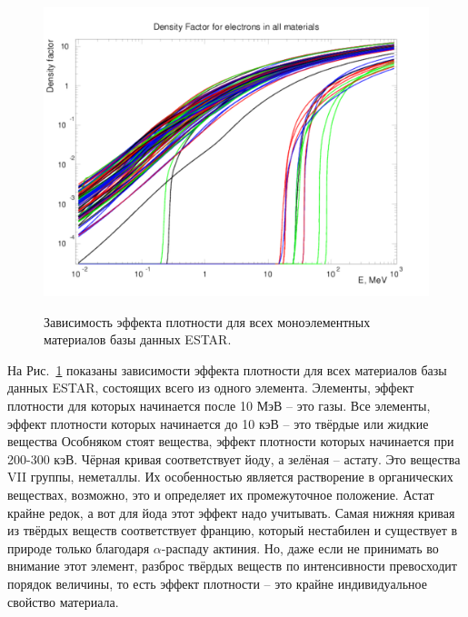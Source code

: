 \documentclass[a4paper,12pt]{article}
\begin{document}
\begin{large}
  \begin{figure}[ht]
    {
       \includegraphics[width=0.99\linewidth]{images/denf_all}
    }
    \caption{Зависимость эффекта плотности для всех моноэлементных материалов базы данных ESTAR.}
    \label{fig:denf_all}
  \end{figure}
  На Рис.~\ref{fig:denf_all} показаны зависимости эффекта плотности для всех материалов базы данных ESTAR, состоящих всего из одного элемента.
  Элементы, эффект плотности для которых начинается после 10 МэВ -- это газы.
  Все элементы, эффект плотности которых начинается до 10 кэВ -- это твёрдые или жидкие вещества
  Особняком стоят вещества, эффект плотности которых начинается при 200-300 кэВ.
  Чёрная кривая соответствует йоду, а зелёная -- астату.
  Это вещества VII группы, неметаллы.
  Их особенностью является растворение в органических веществах, возможно, это и определяет их промежуточное положение.
  Астат крайне редок, а вот для йода этот эффект надо учитывать.
  Самая нижняя кривая из твёрдых веществ соответствует францию, который нестабилен и существует в природе только благодаря $\alpha$-распаду актиния.
  Но, даже если не принимать во внимание этот элемент, разброс твёрдых веществ по интенсивности превосходит порядок величины, то есть эффект плотности -- это крайне индивидуальное свойство материала.
  

\end{large}
\end{document}

